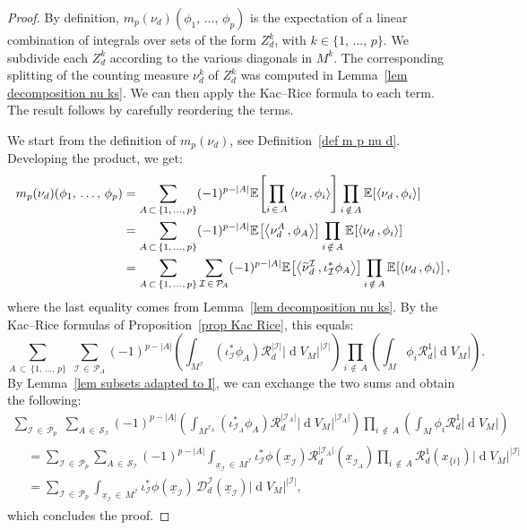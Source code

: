 \documentclass[10pt]{amsart}
\theoremstyle{definition}\newtheorem{defi}[theo]{Definition}\newtheorem{rema}[theo]{Remark}\newtheorem{exam}[theo]{Example}\newtheorem{exem}[theo]{Example}\newtheorem{nota}[theo]{Notation}
\DeclareMathOperator{\dmesure}{d}
\newcommand{\D}{\mathcal{D}}
\newcommand{\I}{\mathcal{I}}
\newcommand{\clR}{\mathcal{R}}
\newcommand{\clS}{\mathcal{S}}
\newcommand{\pa}{\mathcal{P}\!}
\newcommand{\esp}[2][]{\mathbb{E}_{#1}\!\left[#2 \right]}
\newcommand{\norm}[1]{\left\lvert #1 \right\rvert}
\newcommand{\prsc}[2]{\left\langle #1\,, #2 \right\rangle}
\newcommand{\rmes}[1]{\norm{\dmesure\! V_{#1}}}
\renewcommand{\tilde}{\widetilde}
\let\oldtilde\tilde
\renewcommand*{\tilde}[1]{\mathchoice{\widetilde{#1}}{\widetilde{#1}}{\oldtilde{#1}}{\oldtilde{#1}}}
\begin{document}
\begin{proof}
By definition, $m_p(\nu_d)(\phi_1,\,\dots,\,\phi_p)$ is the expectation of a linear combination of integrals over sets of the form $Z_d^k$, with $k \in \{1,\,\dots,\,p\}$. We subdivide each $Z_d^k$ according to the various diagonals in $M^k$. The corresponding splitting of the counting measure $\nu_d^k$ of $Z_d^k$ was computed in Lemma~\ref{lem decomposition nu ks}. We can then apply the Kac--Rice formula to each term. The result follows by carefully reordering the terms.

We start from the definition of $m_p(\nu_d)$, see Definition~\ref{def m p nu d}. Developing the product, we get:
\begin{align*}
m_p(\nu_d)(\phi_1,\,\dots,\,\phi_p) &= \sum_{A\,\subset\,\{1,\,\dots,\,p\}} (-1)^{p-\norm{A}} \esp{\prod_{i\,\in\,A} \prsc{\nu_d}{\phi_i}} \prod_{i\,\notin\,A}\esp{\prsc{\nu_d}{\phi_i}}\\
&= \sum_{A\,\subset\,\{1,\,\dots,\,p\}} (-1)^{p-\norm{A}} \esp{\prsc{\nu_d^A}{\phi_A}} \prod_{i\,\notin\,A}\esp{\prsc{\nu_d}{\phi_i}}\\
&= \sum_{A\,\subset\,\{1,\,\dots,\,p\}} \sum_{\I\,\in\,\pa_A} (-1)^{p-\norm{A}} \esp{\prsc{\tilde{\nu}_d^\I}{\iota_\I^*\phi_A}} \prod_{i\,\notin\,A}\esp{\prsc{\nu_d}{\phi_i}},
\end{align*}
where the last equality comes from Lemma~\ref{lem decomposition nu ks}. By the Kac--Rice formulas of Proposition~\ref{prop Kac Rice}, this equals:
\[
\sum_{A\,\subset\,\{1,\,\dots,\,p\}}\;\sum_{\I\,\in\,\pa_A} (-1)^{p-\norm{A}} \left(\int_{M^\I} \left(\iota_\I^*\phi_A\right) \clR_d^{\norm{\I}} \rmes{M}^{\norm{\I}}\right) \prod_{i \,\notin\,A} \left(\int_M \phi_i \clR_d^1 \rmes{M}\right).
\]
By Lemma~\ref{lem subsets adapted to I}, we can exchange the two sums and obtain the following:
\begin{multline*}
\sum_{\I\,\in\,\pa_p}\;\sum_{A\,\in\,\clS_\I} (-1)^{p-\norm{A}} \left(\int_{M^{\I_A}} \left(\iota_{\I_A}^*\phi_A\right) \clR_d^{\norm{\I_A}} \rmes{M}^{\norm{\I_A}}\right) \prod_{i\,\notin\,A} \left(\int_M \phi_i \clR_d^1 \rmes{M}\right)\\
\begin{aligned}
&= \sum_{\I\,\in\,\pa_p} \sum_{A\,\in\,\clS_\I} (-1)^{p-\norm{A}} \int_{\underline{x}_\I\,\in\,M^\I} \iota_\I^*\phi\left(\underline{x}_\I\right) \clR_d^{\norm{\I_A}}\left(\underline{x}_{\I_A}\right) \prod_{i\,\notin\,A} \clR_d^1\left(x_{\{i\}}\right) \rmes{M}^{\norm{\I}}\\
&= \sum_{\I\,\in\,\pa_p} \int_{\underline{x}_\I\,\in\,M^\I} \iota_\I^*\phi\left(\underline{x}_\I\right)\,\D_d^\I\left(\underline{x}_\I\right) \rmes{M}^{\norm{\I}},
\end{aligned}
\end{multline*}
which concludes the proof.
\end{proof}
\end{document}

